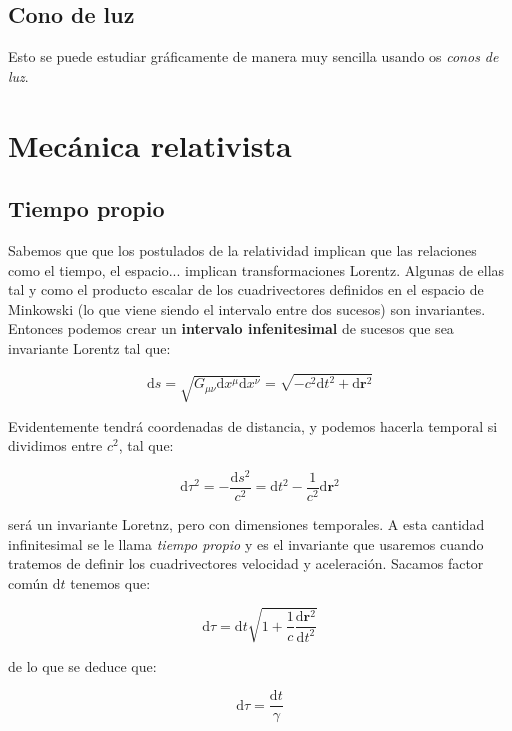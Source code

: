 \documentclass[12pt,a4paper]{book}
\newcommand{\D}{\mathrm{d}}
\begin{document}
\subsection{Cono de luz}

Esto se puede estudiar gráficamente de manera muy sencilla usando os \textit{conos de luz}.


\section{Mecánica relativista}

\subsection{Tiempo propio}

Sabemos que que los postulados de la relatividad implican que las relaciones como el tiempo, el espacio... implican transformaciones Lorentz. Algunas de ellas tal y como el producto escalar de los cuadrivectores definidos en el espacio de Minkowski (lo que viene siendo el intervalo entre dos sucesos) son invariantes. Entonces podemos crear un \textbf{intervalo infenitesimal} de sucesos que sea invariante Lorentz tal que:

\begin{equation}
\D s = \sqrt{G_{\mu \nu} \D x^{\mu} \D x^{\nu}} = \sqrt{- c^2 \D t^2 + \D \mathbf{r}^2}
\end{equation}

Evidentemente tendrá coordenadas de distancia, y podemos hacerla temporal si dividimos entre $c^2$, tal que:

\begin{equation}
\D \tau^2 = - \dfrac{\D s^2}{c^2} = \D t^2 - \dfrac{1}{c^2} \D \mathbf{r}^2 \label{Ec:4.3.1-028}
\end{equation}

será un invariante Loretnz, pero con dimensiones temporales. A esta cantidad infinitesimal se le llama \textit{tiempo propio} y es el invariante que usaremos cuando tratemos de definir los cuadrivectores velocidad y aceleración. Sacamos factor común $\D t$ tenemos que:

\begin{equation}
\D \tau = \D t \sqrt{1+\dfrac{1}{c} \dfrac{\D \mathbf{r}^2}{\D t^2}} 
\end{equation}

de lo que se deduce que:

\begin{equation}
\D \tau = \dfrac{\D t}{\gamma}
\end{equation}
\end{document}
